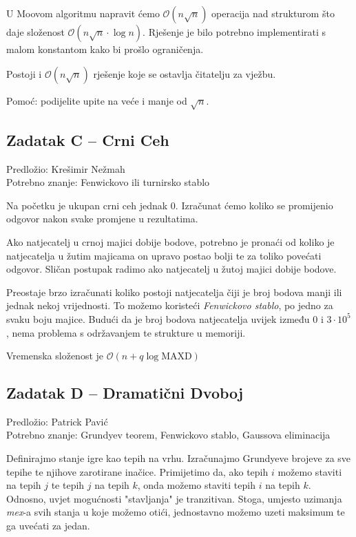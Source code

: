 \documentclass[a4paper]{article}
\begin{document}
U Moovom algoritmu napravit ćemo $\mathcal{O}(n\sqrt{n})$ operacija nad
strukturom što daje složenost $\mathcal{O}(n\sqrt{n}\cdot \log{} n)$. Rješenje
je bilo potrebno implementirati s malom konstantom kako bi prošlo ograničenja.

Postoji i $\mathcal{O}(n\sqrt{n})$ rješenje koje se ostavlja čitatelju za vježbu.

Pomoć: podijelite upite na veće i manje od $\sqrt{n}$.
\clearpage

\subsection*{Zadatak C -- Crni Ceh}
\textsf{Predložio: Krešimir Nežmah}\\
\textsf{Potrebno znanje: Fenwickovo ili turnirsko stablo}

Na početku je ukupan crni ceh jednak $0$. Izračunat ćemo koliko se promijenio
odgovor nakon svake promjene u rezultatima.

Ako natjecatelj u crnoj majici dobije bodove, potrebno je pronaći od koliko je
natjecatelja u žutim majicama on upravo postao bolji te za toliko povećati
odgovor. Sličan postupak radimo ako natjecatelj u žutoj majici dobije bodove.

Preostaje brzo izračunati koliko postoji natjecatelja čiji je broj bodova manji
ili jednak nekoj vrijednosti. To možemo koristeći \textit{Fenwickovo stablo},
po jedno za svaku boju majice. Budući da je broj bodova natjecatelja uvijek
između $0$ i $3\cdot10^5$, nema problema s održavanjem te strukture u memoriji.

Vremenska složenost je $\mathcal{O}(n + q \log{} \text{MAXD})$

\subsection*{Zadatak D -- Dramatični Dvoboj}
\textsf{Predložio: Patrick Pavić}\\
\textsf{Potrebno znanje: Grundyev teorem, Fenwickovo stablo, Gaussova eliminacija}

Definirajmo stanje igre kao tepih na vrhu. Izračunajmo Grundyeve brojeve za sve
tepihe te njihove zarotirane inačice. Primijetimo da, ako tepih $i$ možemo
staviti na tepih $j$ te tepih $j$ na tepih $k$, onda možemo staviti tepih $i$
na tepih $k$. Odnosno, uvjet mogućnosti "stavljanja" je tranzitivan.
Stoga, umjesto uzimanja \textit{mex}-a svih stanja u koje možemo otići,
jednostavno možemo uzeti maksimum te ga uvećati za jedan.
\end{document}
